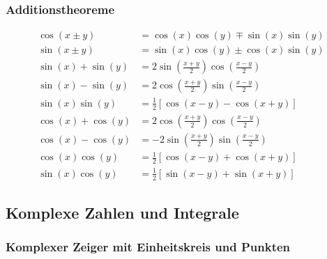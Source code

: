 \documentclass[12pt]{article}
\begin{document}
      \hfill
      \begin{minipage}[t]{0.45\textwidth}
         \subsubsection*{Additionstheoreme}
            \begin{align*}
               \cos(x \pm y) &= \cos(x)\cos(y) \mp \sin(x)\sin(y) \\
               \sin(x \pm y) &= \sin(x)\cos(y) \pm \cos(x)\sin(y) \\
               \sin(x) + \sin(y) &= 2\sin\left(\frac{x+y}{2}\right)\cos\left(\frac{x-y}{2}\right) \\
               \sin(x) - \sin(y) &= 2\cos\left(\frac{x+y}{2}\right)\sin\left(\frac{x-y}{2}\right) \\
               \sin(x)\sin(y) &= \frac{1}{2}\left[\cos(x-y) - \cos(x+y)\right] \\
               \cos(x) + \cos(y) &= 2\cos\left(\frac{x+y}{2}\right)\cos\left(\frac{x-y}{2}\right) \\
               \cos(x) - \cos(y) &= -2\sin\left(\frac{x+y}{2}\right)\sin\left(\frac{x-y}{2}\right) \\
               \cos(x)\cos(y) &= \frac{1}{2}\left[\cos(x-y) + \cos(x+y)\right] \\
               \sin(x)\cos(y) &= \frac{1}{2}\left[\sin(x-y) + \sin(x+y)\right]
            \end{align*}
      \end{minipage}

      \newpage
      
   \subsection*{Komplexe Zahlen und Integrale}
      \subsubsection*{Komplexer Zeiger mit Einheitskreis und Punkten}
\end{document}
